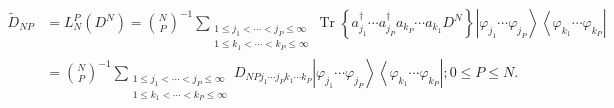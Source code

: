 \documentclass[aps,preprint]{revtex4}%
\begin{document}
\begin{align}
\tilde{D}_{NP}  &  =L_{N}^{P}\left(  D^{N}\right)  =\binom{N}{P}^{-1}%
\sum_{\substack{1\leq j_{1}<\cdots<j_{P}\leq\infty\\1\leq k_{1}<\cdots
<k_{P}\leq\infty}}\operatorname{Tr}\left\{  a_{j_{1}}^{\dagger}\cdots
a_{j_{P}}^{\dagger}a_{k_{P}}\cdots a_{k_{1}}D^{N}\right\}  \left\vert
\varphi_{j_{1}}\cdots\varphi_{j_{P}}\right\rangle \left\langle \varphi_{k_{1}%
}\cdots\varphi_{k_{P}}\right\vert \nonumber\\
&  =\binom{N}{P}^{-1}\sum_{\substack{1\leq j_{1}<\cdots<j_{P}\leq\infty\\1\leq
k_{1}<\cdots<k_{P}\leq\infty}}D_{NPj_{1}\cdots j_{P}k_{1}\cdots k_{P}%
}\left\vert \varphi_{j_{1}}\cdots\varphi_{j_{P}}\right\rangle \left\langle
\varphi_{k_{1}}\cdots\varphi_{k_{P}}\right\vert ;0\leq P\leq N.
\end{align}
\end{document}
